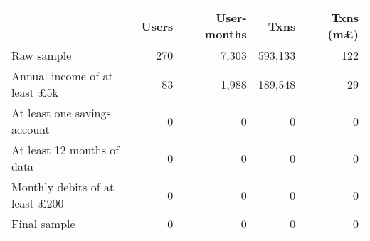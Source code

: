 \begin{tabular}{lrrrr}
\toprule
                                      & Users & User-months &    Txns & Txns (m\pounds) \\
\midrule
                           Raw sample &   270 &       7,303 & 593,133 &             122 \\
  Annual income of at least \pounds5k &    83 &       1,988 & 189,548 &              29 \\
         At least one savings account &     0 &           0 &       0 &               0 \\
           At least 12 months of data &     0 &           0 &       0 &               0 \\
Monthly debits of at least \pounds200 &     0 &           0 &       0 &               0 \\
                         Final sample &     0 &           0 &       0 &               0 \\
\bottomrule
\end{tabular}
